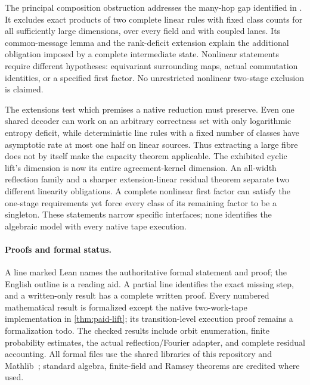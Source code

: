 The principal composition obstruction addresses the many-hop gap identified in
\cite[Section~7.4]{SeventeenthPaper2026}. It excludes exact products of two complete
linear rules with fixed class counts for all sufficiently large dimensions,
over every field and with coupled lanes. Its common-message lemma and the
rank-deficit extension explain the additional obligation imposed by a complete
intermediate state. Nonlinear statements require different hypotheses:
equivariant surrounding maps, actual commutation identities, or a specified
first factor. No unrestricted nonlinear two-stage exclusion is claimed.

The extensions test which premises a native reduction must preserve.
Even one shared decoder can work on an arbitrary correctness set with only
logarithmic entropy deficit, while deterministic line rules with a fixed
number of classes have asymptotic rate at most one half on linear sources.
Thus extracting a large fibre does not
by itself make the capacity theorem applicable. The exhibited cyclic lift's dimension is
now its entire agreement-kernel dimension. An all-width reflection family
and a sharper extension-linear residual theorem separate two different
linearity obligations. A complete nonlinear first factor can satisfy the
one-stage requirements yet force every class of its remaining factor to be
a singleton. These statements narrow specific interfaces; none identifies
the algebraic model with every native tape execution.

\paragraph{Proofs and formal status.}
A line marked \textsf{Lean} names the authoritative formal statement and proof;
the English outline is a reading aid. A partial line identifies the exact missing
step, and a written-only result has a complete written proof. Every numbered
mathematical result is formalized except the native two-work-tape implementation
in \cref{thm:paid-lift}; its transition-level execution proof remains a formalization
todo. The checked results include orbit enumeration, finite probability estimates, the actual
reflection/Fourier adapter, and complete residual accounting. All formal files use the shared
libraries of this repository and Mathlib~\cite{Mathlib2026}; standard algebra,
finite-field and Ramsey theorems are credited where used.

